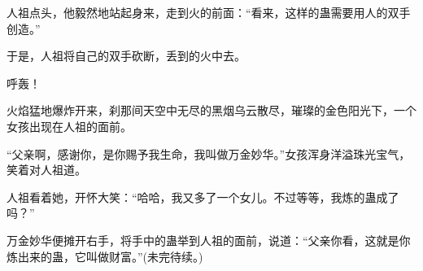 \begin{this_body}
人祖点头，他毅然地站起身来，走到火的前面：“看来，这样的蛊需要用人的双手创造。”

于是，人祖将自己的双手砍断，丢到的火中去。

呼轰！

火焰猛地爆炸开来，刹那间天空中无尽的黑烟乌云散尽，璀璨的金色阳光下，一个女孩出现在人祖的面前。

“父亲啊，感谢你，是你赐予我生命，我叫做万金妙华。”女孩浑身洋溢珠光宝气，笑着对人祖道。

人祖看着她，开怀大笑：“哈哈，我又多了一个女儿。不过等等，我炼的蛊成了吗？”

万金妙华便摊开右手，将手中的蛊举到人祖的面前，说道：“父亲你看，这就是你炼出来的蛊，它叫做财富。”(未完待续。)

\end{this_body}

